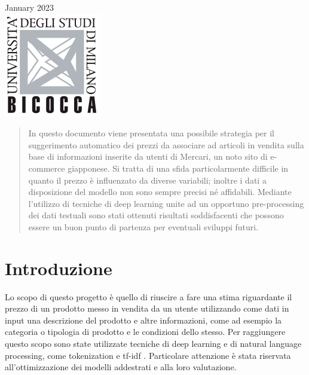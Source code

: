 \begin{titlepage}
{\large January 2023}\\[1.5cm] %


\includegraphics{logo.png}\\[1cm] %
 

\vfill %

\end{titlepage}


\begin{abstract}
In questo documento viene presentata una possibile strategia per il suggerimento automatico dei prezzi da associare ad articoli 
in vendita sulla base di informazioni inserite da utenti di Mercari, un noto sito di e-commerce giapponese. Si tratta di una 
sfida particolarmente difficile in quanto il prezzo è influenzato da diverse variabili; inoltre i dati a disposizione del modello 
non sono sempre precisi né affidabili. Mediante l'utilizzo di tecniche di deep learning unite ad un opportuno pre-processing 
dei dati testuali sono stati ottenuti risultati soddisfacenti che possono essere un buon punto di partenza per eventuali 
sviluppi futuri.
\end{abstract}

\section{Introduzione}
Lo scopo di questo progetto è quello di riuscire a fare una stima riguardante il prezzo di un prodotto messo 
in vendita da un utente utilizzando come dati in input una descrizione del prodotto e altre informazioni, come ad 
esempio la categoria o tipologia di prodotto e le condizioni dello stesso.
Per raggiungere questo scopo sono state utilizzate tecniche di deep learning e di natural language processing, come 
tokenization e tf-idf \cite{tfidf}. Particolare attenzione è stata riservata all'ottimizzazione dei modelli addestrati e alla loro valutazione. \\

